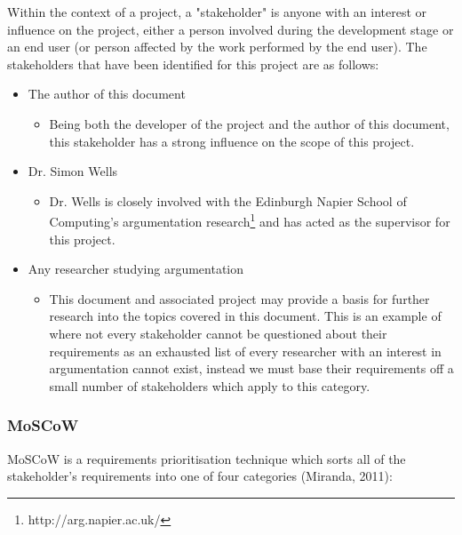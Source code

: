 \documentclass[12pt,a4paper]{article}
\begin{document}
Within the context of a project, a "stakeholder" is anyone with an interest or influence on the project, either a person involved during the development stage or an end user (or person affected by the work performed by the end user). The stakeholders that have been identified for this project are as follows:
\begin{itemize}
    \item The author of this document
    \begin{itemize}
        \item Being both the developer of the project and the author of this document, this stakeholder has a strong influence on the scope of this project.
    \end{itemize}
    \item Dr. Simon Wells
    \begin{itemize}
        \item Dr. Wells is closely involved with the Edinburgh Napier School of Computing's argumentation research\footnote{http://arg.napier.ac.uk/} and has acted as the supervisor for this project.
    \end{itemize}
    \item Any researcher studying argumentation
    \begin{itemize}
        \item This document and associated project may provide a basis for further research into the topics covered in this document. This is an example of where not every stakeholder cannot be questioned about their requirements as an exhausted list of every researcher with an interest in argumentation cannot exist, instead we must base their requirements off a small number of stakeholders which apply to this category.
    \end{itemize}
\end{itemize}

\subsubsection{MoSCoW}

MoSCoW is a requirements prioritisation technique which sorts all of the stakeholder's requirements into one of four categories (Miranda, 2011):
\end{document}
